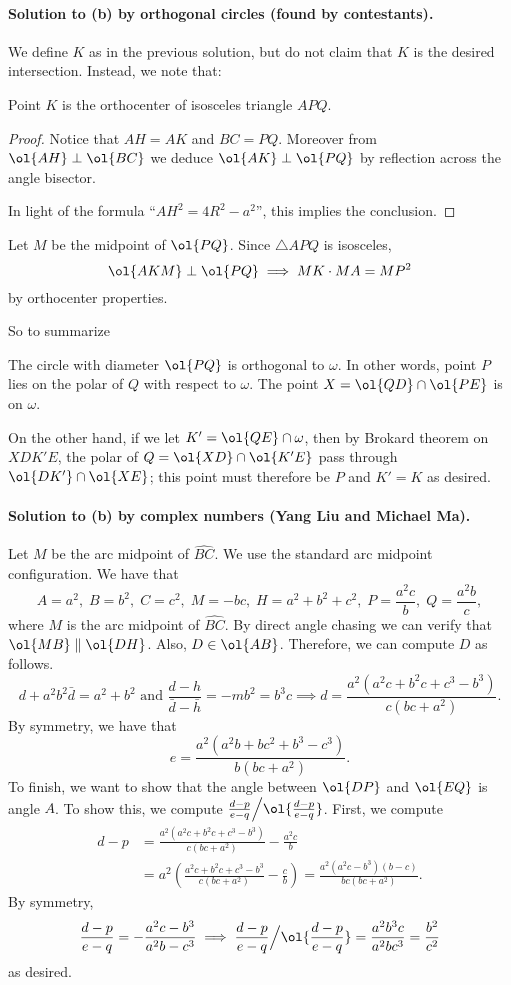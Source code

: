 \paragraph{Solution to (b) by orthogonal circles (found by contestants).}
We define $K$ as in the previous solution,
but do not claim that $K$ is the desired intersection.
Instead, we note that:

\begin{claim*}
  Point $K$ is the orthocenter of isosceles triangle $APQ$.
\end{claim*}
\begin{proof}
  Notice that $AH = AK$ and $BC = PQ$.
  Moreover from $\ol{AH} \perp \ol{BC}$
  we deduce $\ol{AK} \perp \ol{PQ}$ by reflection
  across the angle bisector.

  In light of the formula ``$AH^2 = 4R^2 - a^2$'', this implies the conclusion.
\end{proof}

Let $M$ be the midpoint of $\ol{PQ}$.
Since $\triangle APQ$ is isosceles,
\[ \ol{AKM} \perp \ol{PQ} \implies MK \cdot MA = MP^2 \]
by orthocenter properties.

So to summarize
\begin{itemize}
  \ii The circle with diameter $\ol{PQ}$ is orthogonal to $\omega$.
  In other words, point $P$ lies on the polar of $Q$ with respect to $\omega$.
  \ii The point $X = \ol{QD} \cap \ol{PE}$ is on $\omega$.
\end{itemize}
On the other hand, if we let $K' = \ol{QE} \cap \omega$,
then by Brokard theorem on $XDK'E$,
the polar of $Q = \ol{XD} \cap \ol{K'E}$ pass through $\ol{DK'} \cap \ol{XE}$;
this point must therefore be $P$ and $K' = K$ as desired.

\paragraph{Solution to (b) by complex numbers (Yang Liu and Michael Ma).}
Let $M$ be the arc midpoint of $\widehat{BC}$.
We use the standard arc midpoint configuration.
We have that
\[ A = a^2, \; B = b^2, \; C = c^2, \; M = -bc, \;
H = a^2+b^2+c^2, \; P = \frac{a^2c}{b}, \; Q = \frac{a^2b}{c}, \]
where $M$ is the arc midpoint of $\widehat{BC}$.
By direct angle chasing we can verify that $\ol{MB} \parallel \ol{DH}$.
Also, $D \in \ol{AB}$.
Therefore, we can compute $D$ as follows.
\[ d + a^2b^2 \bar{d} = a^2+b^2 \text{ and }
  \frac{d-h}{\bar{d} - \bar{h}} = -mb^2 = b^3c \implies
  d = \frac{a^2(a^2c+b^2c+c^3-b^3)}{c(bc+a^2)}. \]
By symmetry, we have that
\[ e = \frac{a^2(a^2b+bc^2+b^3-c^3)}{b(bc+a^2)}. \]
To finish, we want to show that the angle
between $\ol{DP}$ and $\ol{EQ}$ is angle $A$.
To show this, we compute
$\frac{d-p}{e-q} \Big/ \ol{\frac{d-p}{e-q}}$.
First, we compute
\begin{align*}
  d-p &= \frac{a^2(a^2c+b^2c+c^3-b^3)}{c(bc+a^2)} - \frac{a^2c}{b} \\
  &= a^2 \left(\frac{a^2c+b^2c+c^3-b^3}{c(bc+a^2)} - \frac{c}{b} \right)
  = \frac{a^2(a^2c-b^3)(b-c)}{bc(bc+a^2)}.
\end{align*}
By symmetry,
\[ \frac{d-p}{e-q} = -\frac{a^2c-b^3}{a^2b-c^3}
  \implies \frac{d-p}{e-q} \Big/ \ol{\frac{d-p}{e-q}}
  = \frac{a^2b^3c}{a^2bc^3} = \frac{b^2}{c^2} \]
as desired.

